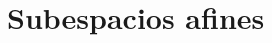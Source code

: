 \section{Subespacios afines}

\begin{comment}
\begin{ejemplo} Algunos ejemplos de espacios afines son:
\begin{enumerate}
    \item En $\bb{R}^2$ la recta $\cc{A}=\{(x,y)\mid x-y=-1\}$.
    
    Tenemos que su espacio de direcciones es $\vec{\cc{A}}=\{(x,y)\mid x=y\}$.
    
    \begin{figure}[H]
    \centering
    \begin{tikzpicture}[scale=0.8]
        \draw[-stealth] (-3,0) -- (3,0) node[below] {$x$};
        \draw[-stealth] (0,-3) -- (0,3) node[left] {$y$};

        \draw[thick, blue] (-3,-2) -- (2,3) node[above left] {$\cc{A}$};
        
        \draw[thick, red] (-3,-3) -- (3,3) node[right] {$\vec{\cc{A}}$};
        
        \draw[-stealth, thick] (0,0) -- (1,1);
    \end{tikzpicture}
    \end{figure}

    Sea $P=(x_1,y_1), Q=(x_2,y_2)\in \cc{A}$. Definimos $\vec{\cdot}:\cc{A}\times \cc{A}\to \cc{A}$ como:
    \begin{equation*}
        \vec{PQ} = (x_2-x_1, y_2-y_1)
    \end{equation*}
    
    Tenemos que es un espacio afín.

    \item En $\bb{R}^3$ el plano $F=\{(x,y,x)\mid ax+by+cz=d\}$ es un espacio afín.
    
    Su espacio de direcciones es $\vec{F}=\{(x,y,x)\mid ax+by+cz=0\}$.
\end{enumerate}
\end{ejemplo}
\end{comment}

